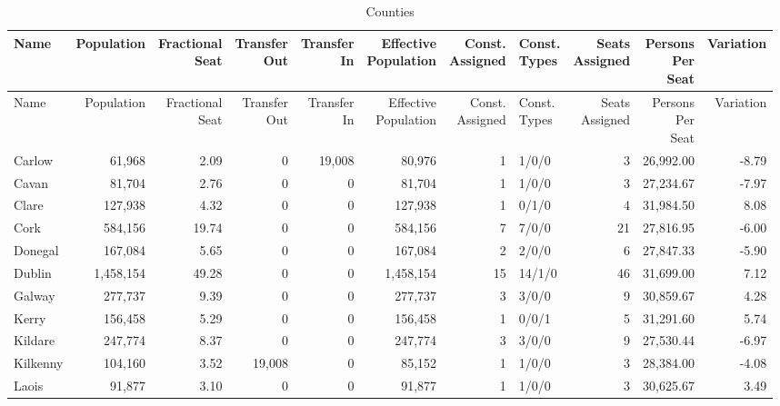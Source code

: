 \documentclass[a4paper]{article}
\begin{document}
\begin{longtable}{lrrrrrrlrrr}
\caption{Counties}
\\ \toprule
Name &Population &\shortstack{Fractional\\Seat} &\shortstack{Transfer\\Out} &\shortstack{Transfer\\In} &\shortstack{Effective\\Population} &\shortstack{Const.\\Assigned} &\shortstack{Const.\\Types} &\shortstack{Seats\\Assigned} &\shortstack{Persons\\Per\\Seat} &Variation \\ \midrule
\endfirsthead
\toprule
Name &Population &\shortstack{Fractional\\Seat} &\shortstack{Transfer\\Out} &\shortstack{Transfer\\In} &\shortstack{Effective\\Population} &\shortstack{Const.\\Assigned} &\shortstack{Const.\\Types} &\shortstack{Seats\\Assigned} &\shortstack{Persons\\Per\\Seat} &Variation \\ \midrule
\endhead
\bottomrule
\endfoot
Carlow&61,968& 2.09&0&19,008&80,976&1&1/0/0&3&26,992.00&-8.79\\ 
Cavan&81,704& 2.76&0&0&81,704&1&1/0/0&3&27,234.67&-7.97\\ 
Clare&127,938& 4.32&0&0&127,938&1&0/1/0&4&31,984.50& 8.08\\ 
Cork&584,156&19.74&0&0&584,156&7&7/0/0&21&27,816.95&-6.00\\ 
Donegal&167,084& 5.65&0&0&167,084&2&2/0/0&6&27,847.33&-5.90\\ 
Dublin&1,458,154&49.28&0&0&1,458,154&15&14/1/0&46&31,699.00& 7.12\\ 
Galway&277,737& 9.39&0&0&277,737&3&3/0/0&9&30,859.67& 4.28\\ 
Kerry&156,458& 5.29&0&0&156,458&1&0/0/1&5&31,291.60& 5.74\\ 
Kildare&247,774& 8.37&0&0&247,774&3&3/0/0&9&27,530.44&-6.97\\ 
Kilkenny&104,160& 3.52&19,008&0&85,152&1&1/0/0&3&28,384.00&-4.08\\ 
Laois&91,877& 3.10&0&0&91,877&1&1/0/0&3&30,625.67& 3.49\\ 

\end{longtable}
\end{document}
